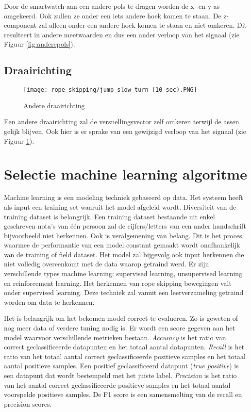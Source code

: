 Door de smartwatch aan een andere pols te dragen worden de x- en y-as omgekeerd. Ook zullen ze onder een iets andere hoek komen te staan. De z-component zal alleen onder een andere hoek komen te staan en niet omkeren. Dit resulteert in andere meetwaarden en dus een ander verloop van het signaal (zie Figuur \ref{fig:anderepols}).

\subsection{Draairichting}
\begin{figure}[!htpd]
\centering
\caption{Andere draairichting}\label{fig:anderedraai}
\texttt{[image: rope\_skipping/jump\_slow\_turn (10 sec).PNG]} 
\end{figure}

Een andere draairichting zal de versnellingsvector zelf omkeren terwijl de assen gelijk blijven. Ook hier is er sprake van een gewijzigd verloop van het signaal (zie Figuur \ref{fig:anderedraai}).

\section{Selectie machine learning algoritme}
Machine learning is een modeling techniek gebaseerd op data. Het systeem heeft als input een training set waaruit het model afgeleid wordt. Diversiteit van de training dataset is belangrijk. Een training dataset bestaande uit enkel geschreven nota's van één persoon zal de cijfers/letters van een ander handschrift bijvoorbeeld niet herkennen. Ook is veralgemening van belang. Dit is het proces waarmee de performantie van een model constant gemaakt wordt onafhankelijk van de training of field dataset. Het model zal bijgevolg ook input herkennen die niet volledig overeenkomt met de data waarop getraind werd. 
Er zijn verschillende types machine learning: supervised learning, unsupervised learning en reinforcement learning. Het herkennen van rope skipping bewegingen valt onder supervised learning. Deze techniek zal vanuit een leerverzameling getraind worden om data te herkennen.

Het is belangrijk om het bekomen model correct te evalueren. Zo is geweten of nog meer data of verdere tuning nodig is. Er wordt een score gegeven aan het model waarvoor verschillende metrieken bestaan.
\textit{Accuracy} is het ratio van correct geclassificeerde datapunten en het totaal aantal datapunten. 
\textit{Recall} is het ratio van het totaal aantal correct geclassificeerde positieve samples en het totaal aantal positieve samples. Een positief geclassificeerd datapunt (\textit{true positive}) is een datapunt dat wordt bestempeld met het juiste label. 
\textit{Precision} is het ratio van het aantal correct geclassificeerde positieve samples en het totaal aantal voorspelde positieve samples.
De F1 score is een samensmelting van de recall en precision scores.

